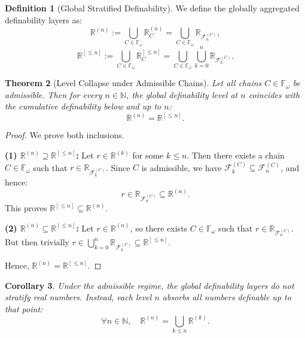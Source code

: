 \documentclass[12pt]{article}
\theoremstyle{definition}
\newtheorem{definition}{Definition}[section]
\theoremstyle{plain}
\newtheorem{theorem}[definition]{Theorem}
\newtheorem{corollary}[definition]{Corollary}
\theoremstyle{remark}
\begin{document}
\begin{definition}[Global Stratified Definability]
We define the globally aggregated definability layers as:
\[
    \mathbb{R}^{(n)} := \bigcup_{C \in \mathbb{F}_\omega} \mathbb{R}_C^{(n)} = \bigcup_{C \in \mathbb{F}_\omega} \mathbb{R}_{\mathcal{F}_n^{(C)}},
\]
\[
    \mathbb{R}^{[\leq n]} := \bigcup_{C \in \mathbb{F}_\omega} \mathbb{R}_C^{[\leq n]} = \bigcup_{C \in \mathbb{F}_\omega} \bigcup_{k=0}^n \mathbb{R}_{\mathcal{F}_k^{(C)}}.
\]
\end{definition}

\begin{theorem}[Level Collapse under Admissible Chains]
\label{thm:admissible-collapse}
Let all chains \( C \in \mathbb{F}_\omega \) be admissible. Then for every \( n \in \mathbb{N} \), the global definability level at \( n \) coincides with the cumulative definability below and up to \( n \):
\[
\mathbb{R}^{(n)} = \mathbb{R}^{[\leq n]}.
\]
\end{theorem}

\begin{proof}
We prove both inclusions.

\textbf{(1) \( \mathbb{R}^{(n)} \supseteq \mathbb{R}^{[\leq n]} \):}  
Let \( r \in \mathbb{R}^{(k)} \) for some \( k \leq n \). Then there exists a chain \( C \in \mathbb{F}_\omega \) such that \( r \in \mathbb{R}_{\mathcal{F}_k^{(C)}} \). Since \( C \) is admissible, we have \( \mathcal{F}_k^{(C)} \subseteq \mathcal{F}_n^{(C)} \), and hence:
\[
r \in \mathbb{R}_{\mathcal{F}_n^{(C)}} \subseteq \mathbb{R}^{(n)}.
\]
This proves \( \mathbb{R}^{[\leq n]} \subseteq \mathbb{R}^{(n)} \).

\textbf{(2) \( \mathbb{R}^{(n)} \subseteq \mathbb{R}^{[\leq n]} \):}  
Let \( r \in \mathbb{R}^{(n)} \), so there exists \( C \in \mathbb{F}_\omega \) such that \( r \in \mathbb{R}_{\mathcal{F}_n^{(C)}} \). But then trivially \( r \in \bigcup_{k=0}^n \mathbb{R}_{\mathcal{F}_k^{(C)}} \subseteq \mathbb{R}^{[\leq n]} \).

Hence, \( \mathbb{R}^{(n)} = \mathbb{R}^{[\leq n]} \).
\end{proof}

\begin{corollary}
Under the admissible regime, the global definability layers do not stratify real numbers. Instead, each level \( n \) absorbs all numbers definable up to that point:
\[
\forall n \in \mathbb{N}, \quad \mathbb{R}^{(n)} = \bigcup_{k \leq n} \mathbb{R}^{(k)}.
\]
\end{corollary}
\end{document}
